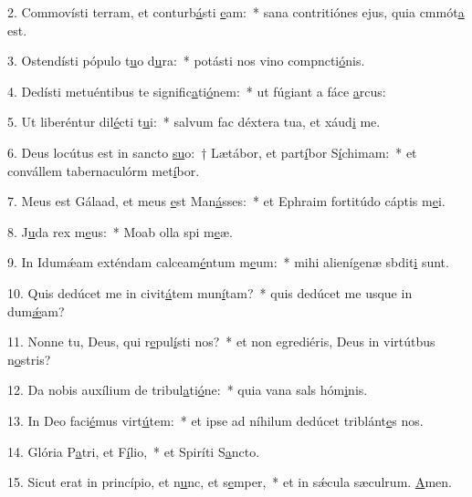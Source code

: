 2. Commovísti terram, et conturb\uline{á}sti \uline{e}am:~* sana contritiónes ejus, quia cmmót\uline{a} est.\par 
3. Ostendísti pópulo t\uline{u}o d\uline{u}ra:~* potásti nos vino compncti\uline{ó}nis.\par 
4. Dedísti metuéntibus te signific\uline{a}ti\uline{ó}nem:~* ut fúgiant a fáce \uline{a}rcus:\par 
5. Ut liberéntur dil\uline{é}cti t\uline{u}i:~* salvum fac déxtera tua, et xáud\uline{i} me.\par 
6. Deus locútus est in sancto \uline{su}o:~† Lætábor, et part\uline{í}bor S\uline{í}chimam:~* et convállem tabernaculórm met\uline{í}bor.\par 
7. Meus est Gálaad, et meus \uline{e}st Man\uline{á}sses:~* et Ephraim fortitúdo cáptis m\uline{e}i.\par 
8. J\uline{u}da rex m\uline{e}us:~* Moab olla spi m\uline{e}æ.\par 
9. In Idumǽam exténdam calceam\uline{é}ntum m\uline{e}um:~* mihi alienígenæ sbdit\uline{i} sunt.\par 
10. Quis dedúcet me in civit\uline{á}tem mun\uline{í}tam?~* quis dedúcet me usque in dum\uline{ǽ}am?\par 
11. Nonne tu, Deus, qui r\uline{e}pul\uline{í}sti nos?~* et non egrediéris, Deus in virtútbus n\uline{o}stris?\par 
12. Da nobis auxílium de tribul\uline{a}ti\uline{ó}ne:~* quia vana sals hóm\uline{i}nis.\par 
13. In Deo faci\uline{é}mus virt\uline{ú}tem:~* et ipse ad níhilum dedúcet triblánt\uline{e}s nos.\par 
14. Glória P\uline{a}tri, et F\uline{í}lio,~* et Spiríti S\uline{a}ncto.\par 
15. Sicut erat in princípio, et n\uline{u}nc, et s\uline{e}mper,~* et in sǽcula sæculrum. \uline{A}men.\par 
